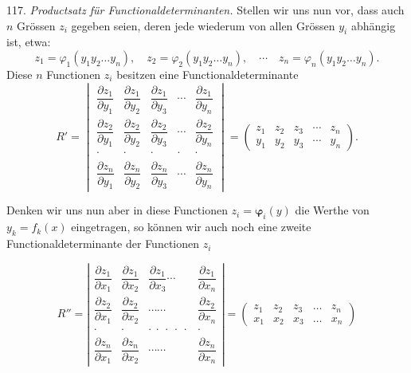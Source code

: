 117. \textit{Productsatz für Functionaldeterminanten.} Stellen wir uns nun vor, dass auch $n$ Grössen $z_i$ gegeben seien, deren jede wiederum von allen Grössen $y_i$ abhängig ist, etwa:
\[
z_1=\varphi_1(y_1y_2\ldots y_n),\quad z_2=\varphi_2(y_1y_2\ldots y_n),\quad\cdots\quad z_n=\varphi_n(y_1y_2\ldots y_n).
\]
Diese $n$ Functionen $z_i$ besitzen eine Functionaldeterminante
\[
R'=\begin{vmatrix}
\dfrac{\partial z_1}{\partial y_1} & \dfrac{\partial z_1}{\partial y_2} & \dfrac{\partial z_1}{\partial y_3} & \cdots & \dfrac{\partial z_1}{\partial y_n}\\[2ex]
\dfrac{\partial z_2}{\partial y_1} & \dfrac{\partial z_2}{\partial y_2} & \dfrac{\partial z_2}{\partial y_3} & \cdots & \dfrac{\partial z_2}{\partial y_n}\\[1.5ex]
\cdot & \cdot & \cdot & \cdot & \cdot\\[1ex]
\dfrac{\partial z_n}{\partial y_1} & \dfrac{\partial z_n}{\partial y_2} & \dfrac{\partial z_n}{\partial y_3} & \cdots & \dfrac{\partial z_n}{\partial y_n}
\end{vmatrix}
=\begin{pmatrix} z_1 & z_2 & z_3 & \cdots & z_n\\ y_1 & y_2 & y_3 & \cdots & y_n \end{pmatrix}.
\]



Denken wir uns nun aber in diese Functionen $z_i = \boldsymbol{\varphi}_i(y)$ die Werthe
von $y_k = f_k(x)$ eingetragen, so können wir auch noch eine zweite
Functionaldeterminante der Functionen $z_i$

\[
R'' = \left|
\begin{array}{cccc}
\dfrac{\partial z_1}{\partial x_1} & \dfrac{\partial z_1}{\partial x_2} & \dfrac{\partial z_1}{\partial x_3} \cdots & \dfrac{\partial z_1}{\partial x_n} \\[2ex]
\dfrac{\partial z_2}{\partial x_1} & \dfrac{\partial z_2}{\partial x_2} & \cdots\cdots & \dfrac{\partial z_2}{\partial x_n} \\[2ex]
\cdot & \cdot & \cdot\ \cdot\ \cdot\ \cdot\ \cdot & \cdot \\[2ex]
\dfrac{\partial z_n}{\partial x_1} & \dfrac{\partial z_n}{\partial x_2} & \cdots\cdots & \dfrac{\partial z_n}{\partial x_n}
\end{array}
\right|
=
\begin{pmatrix} z_1 & z_2 & z_3 & \ldots & z_n \\ x_1 & x_2 & x_3 & \ldots & x_n \end{pmatrix}
\]

